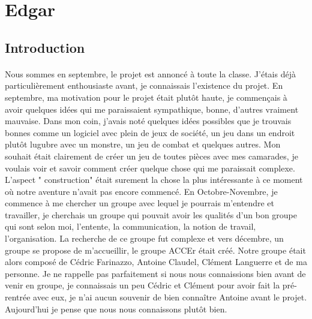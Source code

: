 \documentclass[titlepage, 13px, a4paper]{report}
\begin{document}
\newpage
\section{Edgar}

\subsection{Introduction}

\paragraph{} \hspace{0pt}
Nous sommes en septembre, le projet est annoncé à toute la classe. 
J’étais déjà particulièrement enthousiaste avant, je connaissais l’existence du projet. 
En septembre, ma motivation pour le projet était plutôt haute, je commençais à avoir quelques idées 
qui me paraissaient sympathique, bonne, d’autres vraiment mauvaise. Dans mon coin, 
j’avais noté quelques idées possibles que je trouvais bonnes comme un logiciel avec plein de jeux de société, 
un jeu dans un endroit plutôt lugubre avec un monstre, un jeu de combat et quelques autres. 
Mon souhait était clairement de créer un jeu de toutes pièces avec mes camarades, 
je voulais voir et savoir comment créer quelque chose qui me paraissait complexe. 
L’aspect " construction"  était surement la chose la plus intéressante à ce moment où notre aventure 
n’avait pas encore commencé. En Octobre-Novembre, je commence à me chercher un groupe avec lequel je pourrais 
m’entendre et travailler, je cherchais un groupe qui pouvait avoir les qualités d’un bon groupe 
qui sont selon moi, l’entente, la communication, la notion de travail, l’organisation. 
La recherche de ce groupe fut complexe et vers décembre, un groupe se propose de m’accueillir, 
le groupe ACCEr était créé. Notre groupe était alors composé de Cédric Farinazzo, Antoine Claudel, 
Clément Languerre et de ma personne. Je ne rappelle pas parfaitement si nous nous connaissions 
bien avant de venir en groupe, je connaissais un peu Cédric et Clément pour avoir fait 
la pré-rentrée avec eux, je n’ai aucun souvenir de bien connaître Antoine avant le projet. 
Aujourd’hui je pense que nous nous connaissons plutôt bien. \\
\end{document}
